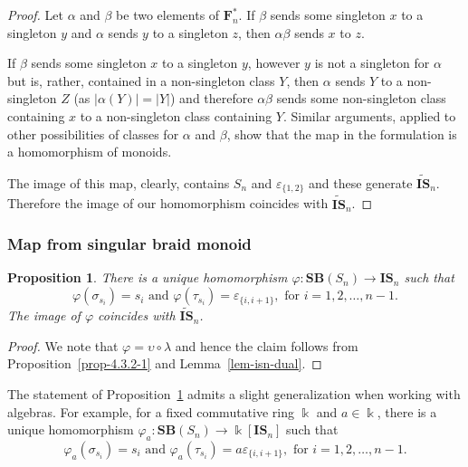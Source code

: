 \documentclass[a4paper]{amsart}
\newtheorem{proposition}[theorem]{Proposition}
\begin{document}
\begin{proof}
Let $\alpha$ and $\beta$ be two elements of $\mathbf{F}^*_n$. If 
$\beta$ sends some singleton $x$ to a singleton $y$ and 
$\alpha$ sends $y$ to a singleton $z$, then $\alpha\beta$ sends $x$ to $z$.

If $\beta$ sends some singleton $x$ to a singleton  $y$,
however $y$ is not a singleton for $\alpha$ but is, rather, 
contained in a non-singleton class $Y$, then 
$\alpha$ sends $Y$ to a non-singleton $Z$ (as $|\alpha(Y)|=|Y|$)
and therefore $\alpha\beta$ sends some non-singleton class containing $x$ 
to a non-singleton class containing $Y$. Similar arguments, applied to 
other possibilities of classes for $\alpha$ and $\beta$, show that the
map in the formulation is a homomorphism of monoids.

The image of this map, clearly, contains $S_n$ and $\varepsilon_{\{1,2\}}$
and these generate $\widetilde{\mathbf{IS}}_n$. Therefore
the image of our homomorphism coincides with $\widetilde{\mathbf{IS}}_n$.
\end{proof}



\subsubsection{Map from singular braid monoid}\label{s4.2.2}

\begin{proposition}\label{prop-4.2.2-1}
There is a unique homomorphism $\varphi:\mathbf{SB}(S_n)\to\mathbf{IS}_n$ such that
\begin{displaymath}
\varphi(\sigma_{s_i})=s_i\text{ and }
\varphi(\tau_{s_i})=\varepsilon_{\{i,i+1\}},\text{ for }i=1,2,\dots,n-1.
\end{displaymath}
The image of $\varphi$ coincides with $\widetilde{\mathbf{IS}}_n$.
\end{proposition}

\begin{proof}
We note that $\varphi={\upsilon}\circ \lambda$ and hence
the claim follows from Proposition~\ref{prop-4.3.2-1} and Lemma~\ref{lem-isn-dual}.
\end{proof}

The statement of Proposition~\ref{prop-4.2.2-1} admits a slight generalization when working with algebras.
For example, for a fixed commutative ring $\Bbbk$ and $a\in\Bbbk$, 
there is a unique homomorphism $\varphi_a:\mathbf{SB}(S_n)\to\Bbbk[\mathbf{IS}_n]$ such that
\begin{displaymath}
\varphi_a(\sigma_{s_i})=s_i\text{ and }
\varphi_a(\tau_{s_i})=a\varepsilon_{\{i,i+1\}},\text{ for }i=1,2,\dots,n-1.
\end{displaymath}
\end{document}
